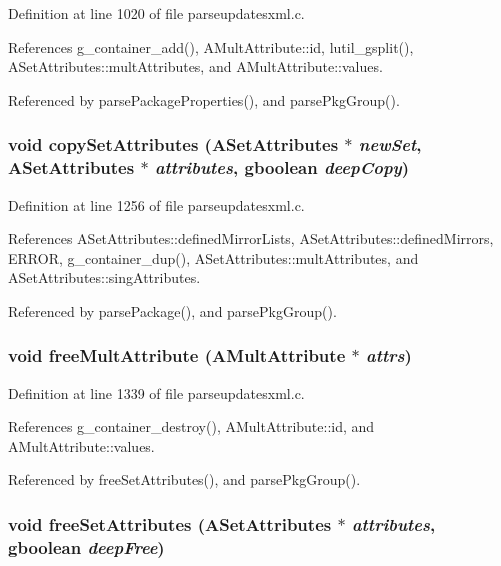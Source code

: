 Definition at line 1020 of file parseupdatesxml.c.

References g\_\-container\_\-add(), AMult\-Attribute::id, lutil\_\-gsplit(), ASet\-Attributes::mult\-Attributes, and AMult\-Attribute::values.

Referenced by parse\-Package\-Properties(), and parse\-Pkg\-Group().
\subsubsection{\setlength{\rightskip}{0pt plus 5cm}void copy\-Set\-Attributes ({\bf ASet\-Attributes} $\ast$ {\em new\-Set}, {\bf ASet\-Attributes} $\ast$ {\em attributes}, gboolean {\em deep\-Copy})\hspace{0.3cm}{\tt  [static]}}\label{parseupdatesxml_8c_a27}




Definition at line 1256 of file parseupdatesxml.c.

References ASet\-Attributes::defined\-Mirror\-Lists, ASet\-Attributes::defined\-Mirrors, ERROR, g\_\-container\_\-dup(), ASet\-Attributes::mult\-Attributes, and ASet\-Attributes::sing\-Attributes.

Referenced by parse\-Package(), and parse\-Pkg\-Group().
\subsubsection{\setlength{\rightskip}{0pt plus 5cm}void free\-Mult\-Attribute ({\bf AMult\-Attribute} $\ast$ {\em attrs})\hspace{0.3cm}{\tt  [static]}}\label{parseupdatesxml_8c_a30}




Definition at line 1339 of file parseupdatesxml.c.

References g\_\-container\_\-destroy(), AMult\-Attribute::id, and AMult\-Attribute::values.

Referenced by free\-Set\-Attributes(), and parse\-Pkg\-Group().
\subsubsection{\setlength{\rightskip}{0pt plus 5cm}void free\-Set\-Attributes ({\bf ASet\-Attributes} $\ast$ {\em attributes}, gboolean {\em deep\-Free})\hspace{0.3cm}{\tt  [static]}}\label{parseupdatesxml_8c_a28}




